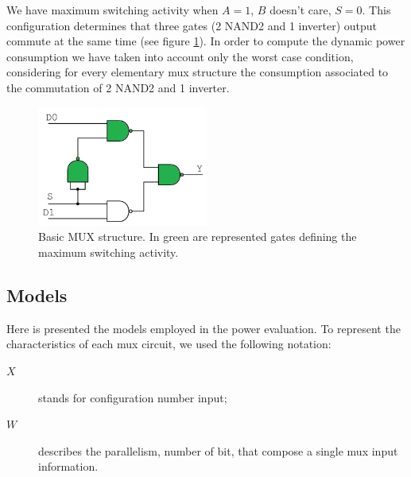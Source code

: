 
We have maximum switching activity when $A=1$, $B$ doesn't care, $S=0$. This configuration determines that three gates (2 NAND2 and 1 inverter) output commute at the same time (see figure \ref{fig:2_to_1_1bit_dyn}). 
In order to compute the dynamic power consumption we have taken into account only the worst case condition, considering for every elementary mux structure the consumption associated to the commutation of 2 NAND2 and 1 inverter.
	\begin{figure}[h]
		\centering
		\includegraphics[width=0.5\textwidth]{immagini/2_to_1_1bit_dyn.png}
		\caption{Basic MUX structure. In green are represented gates defining the maximum switching activity.}
		\label{fig:2_to_1_1bit_dyn}
	\end{figure}
\subsection{Models}
Here is presented the models employed in the power evaluation. To represent the characteristics of each mux circuit, we used the following notation:  
	\begin{description}
		\item[$X$]	stands for configuration number input;	%
		\item[$W$]	describes the parallelism, number of bit, that compose a single mux input information.
	\end{description}
